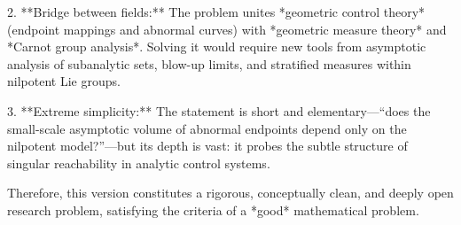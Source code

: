 2. **Bridge between fields:**  
   The problem unites *geometric control theory* (endpoint mappings and abnormal curves) with *geometric measure theory* and *Carnot group analysis*. Solving it would require new tools from asymptotic analysis of subanalytic sets, blow-up limits, and stratified measures within nilpotent Lie groups.  

3. **Extreme simplicity:**  
   The statement is short and elementary—“does the small-scale asymptotic volume of abnormal endpoints depend only on the nilpotent model?”—but its depth is vast: it probes the subtle structure of singular reachability in analytic control systems.  

Therefore, this version constitutes a rigorous, conceptually clean, and deeply open research problem, satisfying the criteria of a *good* mathematical problem.